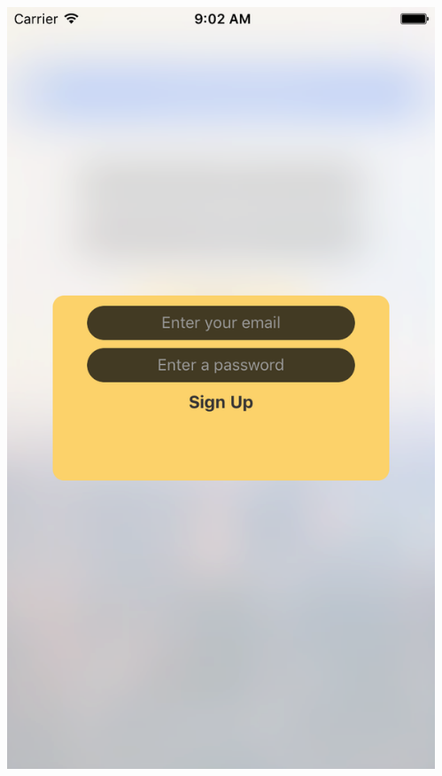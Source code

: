 \documentclass{beamer}
\begin{document}
\begin{frame}
\begin{columns}
\begin{column}{0.3\textwidth}
\begin{center}
        \end{center}
    \end{column}
    \begin{column}{0.3\textwidth}  %
        \begin{center}
            \includegraphics[scale=0.14]{registration}
        \end{center}
    \end{column}
\end{columns}
\end{frame}
\end{document}
